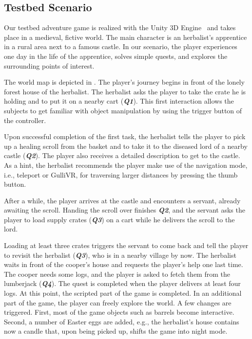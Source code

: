 \documentclass{sigchi}
\begin{document}
\subsection{Testbed Scenario}

Our testbed adventure game is realized with the Unity 3D Engine~\cite{unity} and takes place in a medieval, fictive world. The main character is an herbalist's apprentice in a rural area next to a famous castle. In our scenario, the player experiences one day in the life of the apprentice, solves simple quests, and explores the surrounding points of interest.

The world map is depicted in . The player's journey begins in front of the lonely forest house of the herbalist. The herbalist asks the player to take the crate he is holding and to put it on a nearby cart (\textit{\textbf{Q1}}). This first interaction allows the subjects to get familiar with object manipulation by using the trigger button of the controller.

Upon successful completion of the first task, the herbalist tells the player to pick up a healing scroll from the basket and to take it to the diseased lord of a nearby castle (\textit{\textbf{Q2}}). The player also receives a detailed description to get to the castle. As a hint, the herbalist recommends the player make use of the navigation mode, i.e., teleport or GulliVR, for traversing larger distances by pressing the thumb button.

After a while, the player arrives at the castle and encounters a servant, already awaiting the scroll. Handing the scroll over finishes \textit{\textbf{Q2}}, and the servant asks the player to load supply crates (\textit{\textbf{Q3}}) on a cart while he delivers the scroll to the lord.

Loading at least three crates triggers the servant to come back and tell the player to 
revisit the herbalist (\textit{\textbf{Q3}}), who is in a nearby village by now. The herbalist waits in front of the cooper's house and requests the player's help one last time. The cooper needs some logs, and the player is asked to fetch them from the lumberjack (\textit{\textbf{Q4}}). The quest is completed when the player delivers at least four logs. At this point, the scripted part of the game is completed. In an additional part of the game, the player can freely explore the world. A few changes are triggered. First, most of the game objects such as barrels become interactive. Second, a number of Easter eggs are added, e.g., the herbalist's house contains now a candle that, upon being picked up, shifts the game into night mode.
\end{document}

